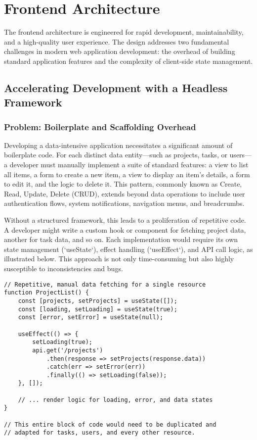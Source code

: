\section{Frontend Architecture}
\label{sec:frontend_architecture}

The frontend architecture is engineered for rapid development, maintainability, and a high-quality user experience. The design addresses two fundamental challenges in modern web application development: the overhead of building standard application features and the complexity of client-side state management.

\subsection{Accelerating Development with a Headless Framework}
\label{subsec:accelerating_development}

\subsubsection{Problem: Boilerplate and Scaffolding Overhead}
Developing a data-intensive application necessitates a significant amount of boilerplate code. For each distinct data entity—such as projects, tasks, or users—a developer must manually implement a suite of standard features: a view to list all items, a form to create a new item, a view to display an item's details, a form to edit it, and the logic to delete it. This pattern, commonly known as Create, Read, Update, Delete (CRUD), extends beyond data operations to include user authentication flows, system notifications, navigation menus, and breadcrumbs.

Without a structured framework, this leads to a proliferation of repetitive code. A developer might write a custom hook or component for fetching project data, another for task data, and so on. Each implementation would require its own state management (`useState`), effect handling (`useEffect`), and API call logic, as illustrated below. This approach is not only time-consuming but also highly susceptible to inconsistencies and bugs.

\begin{verbatim}
// Repetitive, manual data fetching for a single resource
function ProjectList() {
    const [projects, setProjects] = useState([]);
    const [loading, setLoading] = useState(true);
    const [error, setError] = useState(null);

    useEffect(() => {
        setLoading(true);
        api.get('/projects')
            .then(response => setProjects(response.data))
            .catch(err => setError(err))
            .finally(() => setLoading(false));
    }, []);

    // ... render logic for loading, error, and data states
}

// This entire block of code would need to be duplicated and
// adapted for tasks, users, and every other resource.
\end{verbatim}

